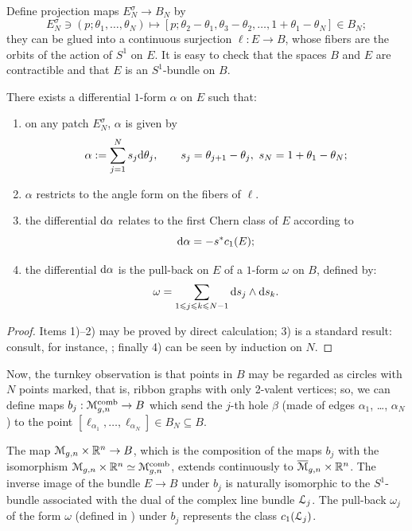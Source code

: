 Define projection maps $E^\sigma_N \to B_N$ by 
\begin{equation*}
  E_N^\sigma \ni (p; \theta_1, \ldots, \theta_N) \mapsto [p; \theta_2 - \theta_1, \theta_3 - \theta_2, \ldots, 1
  + \theta_1 - \theta_N] \in B_N;
\end{equation*}
they can be glued into a continuous surjection $\ell: E \to B$, whose
fibers are the orbits of the action of $S^1$ on $E$. It is easy to
check that the spaces $B$ and $E$ are contractible and that $E$ is an
$S^1$-bundle on $B$.
\begin{lemma}
  \label{thm:comb-bundle}
  There exists a differential $1$-form $\alpha$ on $E$ such that:
  \begin{enumerate}
  \item on any patch $E^\sigma_N$, $\alpha$ is given by
    \begin{equation*}
      \alpha := \sum_{j=1}^N s_j \mathrm{d}\theta_j, \qquad s_j= \theta_{j+1} - \theta_j, \ s_N = 1 +
      \theta_1 - \theta_N;
    \end{equation*}
  \item $\alpha$  restricts to the angle form on the fibers of $\ell$.
  \item   the differential $\mathrm{d}\alpha$ relates to the first Chern class of $E$
    according to
    \begin{equation*}
      \mathrm{d}\alpha = -s^*c_1(E);
    \end{equation*}
  \item the differential $\mathrm{d}\alpha$ is the pull-back on $E$ of a $1$-form $\omega$
    on $B$, defined by:
    \begin{equation*}
      \omega = \sum_{1\leqslant j\leqslant k\leqslant N-1} \mathrm{d} s_j \land \mathrm{d} s_k.
    \end{equation*}
  \end{enumerate}
\end{lemma}
\begin{proof}
  Items 1)--2) may be proved by direct calculation; 3) is a standard
  result: consult, for instance, \cite{bott-tu}; finally 4) can be
  seen by induction on $N$.
\end{proof}

Now, the turnkey observation is that points in $B$ may be regarded as
circles with $N$ points marked, that is, ribbon graphs with only
2-valent vertices; so, we can define maps $b_j: \mathcal{M}\sp{\text{comb}}_{g,n} \to B$ which
send the $j$-th hole $\beta$ (made of edges $\alpha_1$, \ldots, $\alpha_N$) to the
point $[\ell_{\alpha_1}, \ldots, \ell_{\alpha_N}] \in B_N \subseteq B$. 
\begin{theorem} The map $\mathcal{M}_{g,n} \times
  \mathbb{R}^n \to B$, which is the composition of the maps $b_j$ with the
  isomorphism $\mathcal{M}_{g,n} \times \mathbb{R}^n \simeq \mathcal{M}\sp{\text{comb}}_{g,n}$, extends continuously to
  $\overline{\mathcal{M}}_{g,n} \times \mathbb{R}^n$. The inverse image of the bundle $E \to B$ under
  $b_j$ is naturally isomorphic to the $S^1$-bundle associated with
  the dual of the complex line bundle ${\mathcal{L}}_j$. The pull-back $\omega_j$ of
  the form $\omega$ (defined in ) under $b_j$
  represents the class $c_1({\mathcal{L}}_j)$.
\end{theorem}


